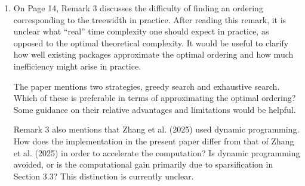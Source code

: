 \documentclass[12pt]{article}
\newenvironment{reply}{\par\smallskip\noindent\color{blue}Reply:\ \ignorespaces}{\par}
\newcommand{\less}{O}          %
\newcommand{\calA}{\mathcal{A}}
\begin{document}
\begin{enumerate}
\begin{reply}
This is a helpful suggestion. We have added a short paragraph immediately after Proposition~1 that computes $\mathsf{tw}(G_{\calA})$ for the small decomposition graphs already displayed in Figure~3 (the figure of example decomposition graphs), explaining the vertex-elimination definition along the way: (a) for the running example $\calA=((1,2),(2,3),(3,4))$, $G_{\calA}$ is a path (chain) on four vertices; eliminating vertices from one end never creates new edges, so the largest degree-at-elimination is~$1$ and $\mathsf{tw}(G_{\calA})=1$, giving complexity $\less(n^{2})$; (b) for the triangle motif $\calA=((1,2),(2,3),(3,1))$, $G_{\calA}=K_3$ and $\mathsf{tw}=2$; (c) for the $4$-clique motif $\calA=((1,2),(1,3),(1,4),(2,3),(2,4),(3,4))$, $G_{\calA}=K_4$ and $\mathsf{tw}=3$ (in general $\mathsf{tw}(K_r)=r-1$). We walk through the elimination ordering in case~(a) explicitly so the reader sees how the value is obtained from Definition~8 (treewidth).
\end{reply}

\item On Page 14, Remark 3 discusses the difficulty of finding an ordering corresponding to the treewidth in practice. After reading this remark, it is unclear what ``real'' time complexity one should expect in practice, as opposed to the optimal theoretical complexity. It would be useful to clarify how well existing packages approximate the optimal ordering and how much inefficiency might arise in practice.

The paper mentions two strategies, greedy search and exhaustive search. Which of these is preferable in terms of approximating the optimal ordering? Some guidance on their relative advantages and limitations would be helpful.

Remark 3 also mentions that Zhang et al. (2025) used dynamic programming. How does the implementation in the present paper differ from that of Zhang et al. (2025) in order to accelerate the computation? Is dynamic programming avoided, or is the computational gain primarily due to sparsification in Section 3.3? This distinction is currently unclear.


\end{enumerate}
\end{document}
